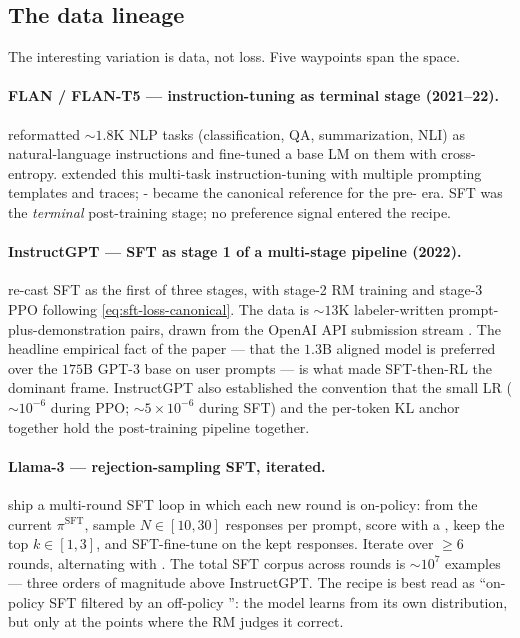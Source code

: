 \subsection{The data lineage}
\label{sec:sft-lineage}

The interesting variation is data, not loss. Five waypoints span the
space.

\paragraph{FLAN / FLAN-T5 — instruction-tuning as terminal stage
(2021--22).} \citet{wei2021-flan} reformatted $\sim\!1.8$K NLP tasks
(classification, QA, summarization, NLI) as natural-language
instructions and fine-tuned a base LM on them with cross-entropy.
\citet{chung2022-flan-t5} extended this multi-task instruction-tuning
with multiple prompting templates and  traces;
- became the canonical reference for the pre- era. SFT was
the \emph{terminal} post-training stage; no preference signal entered
the recipe.

\paragraph{InstructGPT — SFT as stage 1 of a multi-stage pipeline
(2022).} \citet[\S 3]{ouyang2022-instructgpt} re-cast SFT as the
first of three stages, with stage-2 RM training and stage-3 PPO
following \cref{eq:sft-loss-canonical}. The data is $\sim\!13$K
labeler-written prompt-plus-demonstration pairs, drawn from the
OpenAI API submission stream
\citep[\S 3.4]{ouyang2022-instructgpt}. The headline empirical fact
of the paper — that the $1.3$B aligned model is preferred over the
$175$B GPT-3 base on user prompts \citep[\S 4]{ouyang2022-instructgpt}
— is what made SFT-then-RL the dominant frame. InstructGPT also
established the convention that the small LR ($\sim\!10^{-6}$ during
PPO; $\sim\!5 \times 10^{-6}$ during SFT) and the per-token KL anchor
together hold the post-training pipeline together.

\paragraph{Llama-3 — rejection-sampling SFT, iterated.}
\citet{meta-llama3} ship a multi-round SFT loop in which each new round
is on-policy: from the current $\pi^{\mathrm{SFT}}$, sample $N \in [10,
30]$ responses per prompt, score with a , keep the top
$k \in [1, 3]$, and SFT-fine-tune on the kept responses. Iterate over
$\geq 6$ rounds, alternating with . The total SFT corpus across
rounds is $\sim\!10^7$ examples — three orders of magnitude above
InstructGPT. The recipe is best read as ``on-policy SFT filtered by an
off-policy '': the model learns from its own distribution,
but only at the points where the RM judges it correct.

